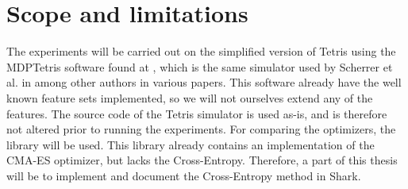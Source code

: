\section{Scope and limitations \label{section:scope}}


The experiments will be carried out on the simplified version of
Tetris using the MDPTetris software found at \citep{mdptetris},
which is the same simulator used by Scherrer et al. in \citep{scherrer2009:b} 
among other authors in various papers.
This software already have the well known feature sets
implemented, so we will not ourselves extend any of the features.
The source code of the Tetris simulator is used as-is, and is therefore 
not altered prior to running the experiments. 
For comparing the optimizers, the \shark library will be used. 
This library already contains an
implementation of the CMA-ES optimizer, but lacks the 
Cross-Entropy. Therefore, a part of this thesis will
be to implement and document the Cross-Entropy method in Shark.




